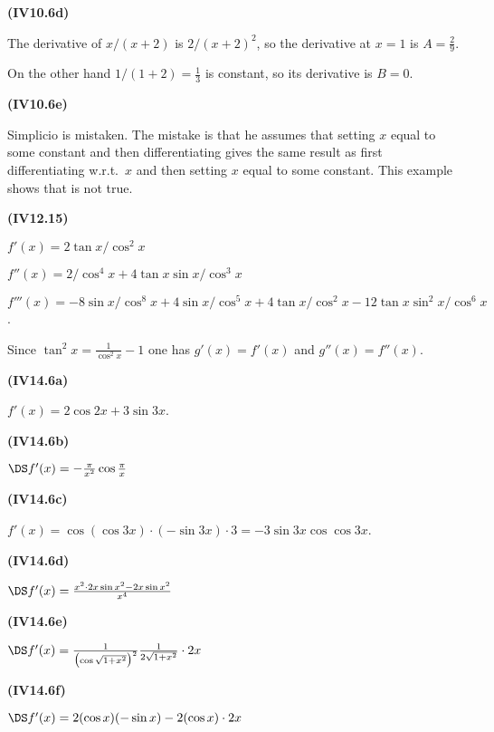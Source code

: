 \documentclass[openany,reqno]{amsbook}
\begin{document}
\begin{trivlist}
  \bigskip

\item[{\bf(IV10.6d)}]

  The derivative of $x/(x+2)$ is $2/(x+2)^2$, so the derivative at $x=1$ is
  $A = \frac29$.

  On the other hand
  $1/(1+2) = \frac13$ is constant, so its derivative is $B=0$.
  \bigskip

\item[{\bf(IV10.6e)}]

  Simplicio is mistaken.  The mistake is that he assumes that setting $x$
  equal to some constant and then differentiating gives the same result as first
  differentiating w.r.t.~$x$ and then setting $x$ equal to some constant.  This
  example shows that is not true.
  \bigskip

\item[{\bf(IV12.15)}]

  $f'(x) = 2\tan x/\cos^2 x$

  $f''(x) = 2/\cos^4 x + 4\tan x \sin x/\cos^3 x$

  $f'''(x) = -8\sin x/\cos^8 x + 4\sin x/\cos^5 x
  + 4\tan x/\cos^2x - 12\tan x \sin^2x/\cos^6x$.

  Since $\tan^2 x= \frac{1}{\cos^2 x}-1$ one has $g'(x) = f'(x)$ and
  $g''(x) = f''(x)$.
  \bigskip

\item[{\bf(IV14.6a)}]

  $f'(x) = 2\cos 2x+3\sin 3x$.
  \bigskip

\item[{\bf(IV14.6b)}]

  $\DS f'(x) = -\frac\pi{x^2}\cos\frac\pi x$
  \bigskip

\item[{\bf(IV14.6c)}]

  $f'(x) = \cos(\cos 3x)\cdot (-\sin 3x)\cdot 3 = -3\sin 3x \cos\cos
  3x$.
  \bigskip

\item[{\bf(IV14.6d)}]

  $\DS f'(x) = \frac{x^2\cdot 2x\sin x^2 - 2x\sin x^2}{x^4}$
  \bigskip

\item[{\bf(IV14.6e)}]

  $\DS f'(x) = \frac1{\bigl(\cos \sqrt{1+x^2}\bigr)^2}
  \frac1{2\sqrt{1+x^2}}\cdot 2x$
  \bigskip

\item[{\bf(IV14.6f)}]

  $\DS f'(x) = 2(\cos x)(-\sin x)-2(\cos x) \cdot 2x$
  \bigskip


\end{trivlist}
\end{document}
